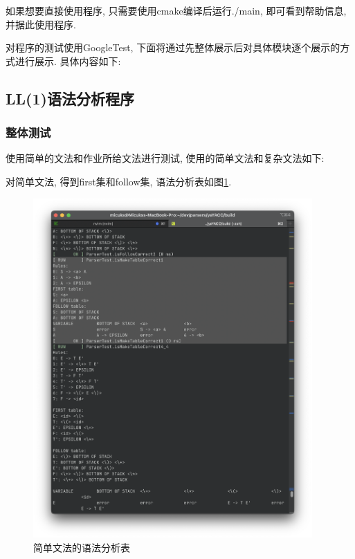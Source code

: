 如果想要直接使用程序, 只需要使用cmake编译后运行./main, 即可看到帮助信息,
并据此使用程序.\par

对程序的测试使用GoogleTest,
下面将通过先整体展示后对具体模块逐个展示的方式进行展示. 具体内容如下:
\subsection{LL(1)语法分析程序}
\subsubsection{整体测试}
使用简单的文法和作业所给文法进行测试, 使用的简单文法和复杂文法如下:


对简单文法, 得到first集和follow集, 语法分析表如图\ref{fig:简单文法的语法分析表}.
\begin{figure}[ht!]
	\begin{center}
		\includegraphics[width=0.95\textwidth]{figures/ll1分析表1.png}
	\end{center}
	\caption{简单文法的语法分析表}
	\label{fig:简单文法的语法分析表}
\end{figure}

